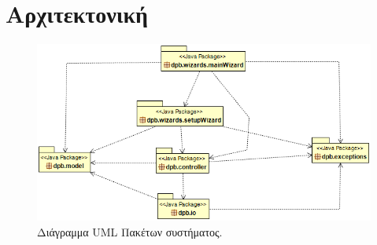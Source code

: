 \section{Αρχιτεκτονική}
\label{sec:packages}
\begin{figure}[H]
    \centering
    \includegraphics[width=1.0\textwidth]{Figures/packages.png}
    \caption{Διάγραμμα UML Πακέτων συστήματος.}
    \label{fig:packageUML}
\end{figure}

